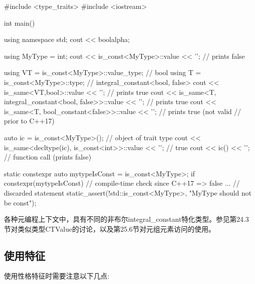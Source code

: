\begin{cpp}
#include <type_traits>
#include <iostream>

int main()
{
	using namespace std;
	cout << boolalpha;
	
	using MyType = int;
	cout << is_const<MyType>::value << ’\n’; // prints false
	
	using VT = is_const<MyType>::value_type; // bool
	using T = is_const<MyType>::type; // integral_constant<bool, false>
	cout << is_same<VT,bool>::value << ’\n’; // prints true
	cout << is_same<T, integral_constant<bool, false>>::value
		<< ’\n’; // prints true
	cout << is_same<T, bool_constant<false>>::value
		<< ’\n’; // prints true (not valid	
				// prior to C++17)
				
	auto ic = is_const<MyType>(); // object of trait type
	cout << is_same<decltype(ic), is_const<int>>::value << ’\n’; // true
	cout << ic() << ’\n’; // function call (prints false)
	
	static constexpr auto mytypeIsConst = is_const<MyType>{};
	if constexpr(mytypeIsConst) { // compile-time check since C++17 => false
		... // discarded statement
	}
	static_assert(!std::is_const<MyType>{}, "MyType should not be const");
}
\end{cpp}

各种元编程上下文中，具有不同的非布尔integral\_constant特化类型。参见第24.3节对类似类型CTValue的讨论，以及第25.6节对元组元素访问的使用。

\subsection{使用特征}

使用性格特征时需要注意以下几点:

